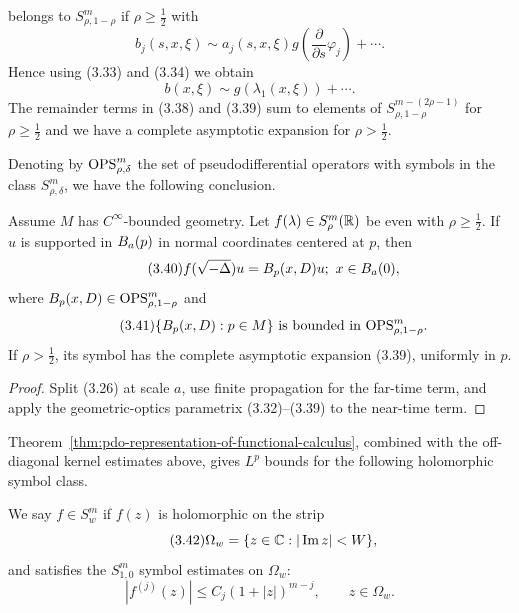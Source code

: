 belongs to $S^m_{\rho,1-\rho}$ if $\rho \ge \frac12$ with
\begin{equation}\tag{3.38}
b_j(s,x,\xi)\sim a_j(s,x,\xi)g\!\left(\frac{\partial}{\partial s}\varphi_j\right)+\cdots.
\end{equation}
Hence using (3.33) and (3.34) we obtain
\begin{equation}\tag{3.39}
b(x,\xi)\sim g(\lambda_1(x,\xi))+\cdots.
\end{equation}
The remainder terms in (3.38) and (3.39) sum to elements of $S^{m-(2\rho-1)}_{\rho,1-\rho}$ for $\rho \ge \frac12$ and we have a complete asymptotic expansion for $\rho>\frac12$.

Denoting by $\mathrm{OPS}^m_{\rho,\delta}$ the set of pseudodifferential operators with symbols in the class $S^m_{\rho,\delta}$, we have the following conclusion.

\begin{theorem}
\label{thm:pdo-representation-of-functional-calculus}

Assume $M$ has $C^\infty$-bounded geometry. Let $f(\lambda)\in S^m_\rho(\mathbb{R})$ be even with $\rho\ge\frac12$. If $u$ is supported in $B_a(p)$ in normal coordinates centered at $p$, then
\begin{equation}\tag{3.40}
f(\sqrt{-\Delta})u=B_p(x,D)u;\ x\in B_a(0),
\end{equation}
where $B_p(x,D)\in \mathrm{OPS}^m_{\rho,1-\rho}$ and
\begin{equation}\tag{3.41}
\{B_p(x,D): p\in M\}\text{ is bounded in }\mathrm{OPS}^m_{\rho,1-\rho}.
\end{equation}
If $\rho>\frac12$, its symbol has the complete asymptotic expansion (3.39), uniformly in $p$.
\end{theorem}
\begin{proof}
\sketch Split (3.26) at scale $a$, use finite propagation for the far-time term, and apply the geometric-optics parametrix (3.32)--(3.39) to the near-time term.
\end{proof}

Theorem~\ref{thm:pdo-representation-of-functional-calculus}, combined with the
off-diagonal kernel estimates above, gives $L^p$ bounds for the following
holomorphic symbol class.

\begin{definition}
\label{def:holomorphic-strip-symbol-class}

We say $f\in S_w^m$ if $f(z)$ is holomorphic on the strip
\begin{equation}\tag{3.42}
\Omega_w=\{z\in \mathbb{C} : |\operatorname{Im} z|<W\},
\end{equation}
and satisfies the $S^m_{1,0}$ symbol estimates on $\Omega_w$:
\begin{equation}\tag{3.43}
|f^{(j)}(z)|\le C_j(1+|z|)^{m-j},\qquad z\in \Omega_w.
\end{equation}
\end{definition}

